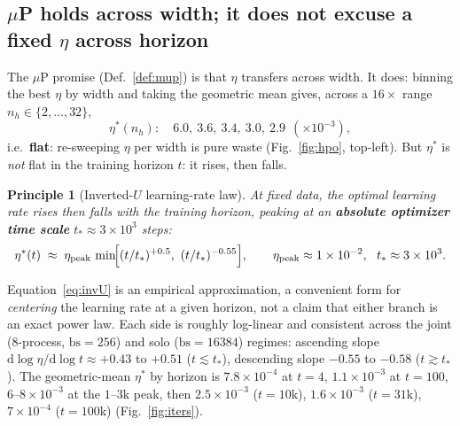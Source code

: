 \documentclass[11pt]{article}
\newcommand{\lrpeak}{\eta_{\mathrm{peak}}}
\newcommand{\tstar}{t_\ast}
\newcommand{\nh}{n_h}
\newtheorem{principle}{Principle}
\begin{document}
\subsection{$\mu$P holds across width; it does not excuse a fixed $\eta$ across horizon}

The $\mu$P promise (Def.~\ref{def:mup}) is that $\eta$ transfers across width. It does:
binning the best $\eta$ by width and taking the geometric mean gives, across a $16\times$
range $\nh\in\{2,\dots,32\}$,
\[
  \eta^\ast(\nh):\quad 6.0,\ 3.6,\ 3.4,\ 3.0,\ 2.9\ \ (\times10^{-3}),
\]
i.e.\ \textbf{flat}: re-sweeping $\eta$ per width is pure waste (Fig.~\ref{fig:hpo}, top-left).
But $\eta^\ast$ is \emph{not} flat in the training horizon $t$: it rises, then falls.

\begin{principle}[Inverted-$U$ learning-rate law]\label{prin:invU}
At fixed data, the optimal learning rate rises then falls with the training horizon,
peaking at an \textbf{absolute optimizer time scale} $\tstar\approx 3\times10^{3}$ steps:
\begin{equation}
  \eta^\ast(t) \;\approx\; \lrpeak\,\min\!\Bigl[(t/\tstar)^{+0.5},\ (t/\tstar)^{-0.55}\Bigr],
  \qquad \lrpeak \approx 1\times10^{-2},\ \ \tstar\approx 3\times10^{3}.
  \label{eq:invU}
\end{equation}
\end{principle}

\noindent Equation~\eqref{eq:invU} is an empirical approximation, a convenient form for
\emph{centering} the learning rate at a given horizon, not a claim that either branch is an exact
power law. Each side is roughly log-linear and consistent across the joint ($8$-process,
$\mathrm{bs}=256$) and solo ($\mathrm{bs}=16384$) regimes: ascending slope
$\mathrm{d}\log\eta/\mathrm{d}\log t \approx +0.43$ to $+0.51$ ($t\lesssim\tstar$), descending
slope $-0.55$ to $-0.58$ ($t\gtrsim\tstar$). The geometric-mean $\eta^\ast$ by horizon is
$7.8\times10^{-4}$ at $t=4$, $1.1\times10^{-3}$ at $t=100$, $6$--$8\times10^{-3}$ at the
$1$--$3$k peak, then $2.5\times10^{-3}$ ($t=10$k), $1.6\times10^{-3}$ ($t=31$k),
$7\times10^{-4}$ ($t=100$k) (Fig.~\ref{fig:iters}).
\end{document}
